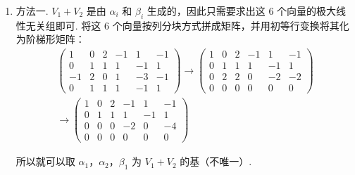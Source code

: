 \begin{solution}
    \begin{enumerate}
        \item 方法一.  $V_1 +V_2$ 是由 $\alpha_i$ 和 $\beta_i$ 生成的，因此只需要求出这 $6$ 个向量的极大线性无关组即可. 将这 $6$ 个向量按列分块方式拼成矩阵，并用初等行变换将其化为阶梯形矩阵：
        \[ \begin{aligned} \begin{pmatrix}
                1 & 0 & 2 & -1 & 1 & -1 \\
                0 & 1 & 1 & 1  & -1 & 1  \\
                -1 & 2 & 0 & 1 & -3 & -1 \\
                0 & 1 & 1 & 1 & -1 & 1
        \end{pmatrix} \xrightarrow{} \begin{pmatrix}
                1 & 0 & 2 & -1 & 1 & -1 \\
                0 & 1 & 1 & 1  & -1 & 1  \\
                0 & 2 & 2 & 0 & -2 & -2 \\
                0 & 0 & 0 & 0 & 0 & 0
        \end{pmatrix} \\
        \xrightarrow{} \begin{pmatrix}
                1 & 0 & 2 & -1 & 1 & -1 \\
                0 & 1 & 1 & 1  & -1 & 1  \\
                0 & 0 & 0 & -2 & 0 & -4 \\
                0 & 0 & 0 & 0 & 0 & 0
        \end{pmatrix} \end{aligned} \]

        所以就可以取 $\alpha_1$，$\alpha_2$，$\beta_1$ 为 $V_1 + V_2$ 的基（不唯一）.


\end{enumerate}
\end{solution}
